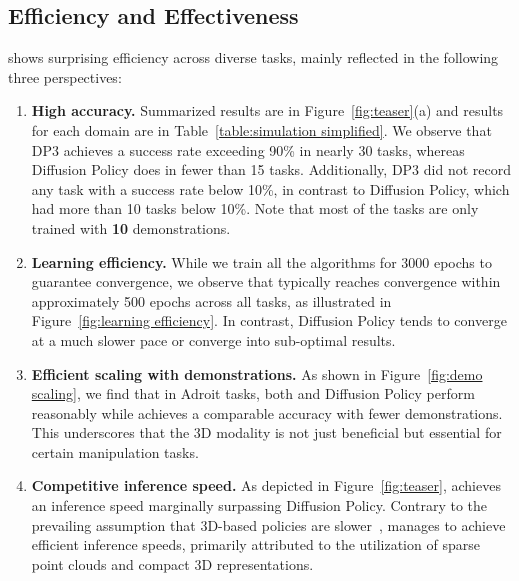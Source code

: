 \subsection{Efficiency and Effectiveness}
\ours shows surprising efficiency across diverse tasks, mainly reflected in the following three perspectives: 
\begin{enumerate}
    \item \textbf{High accuracy.} Summarized results are in Figure~\ref{fig:teaser}(a) and results for each domain are in Table~\ref{table:simulation simplified}. 
    We observe that DP3 achieves a success rate exceeding 90\% in nearly 30 tasks, whereas Diffusion Policy does in fewer than 15 tasks. Additionally, DP3 did not record any task with a success rate below 10\%, in contrast to Diffusion Policy, which had more than 10 tasks below 10\%. Note that most of the tasks are only trained with \textbf{10} demonstrations.
    \item \textbf{Learning efficiency.}
    While we train all the algorithms for 3000 epochs to guarantee convergence, we observe that \ours typically reaches convergence within approximately 500 epochs across all tasks, as illustrated in Figure~\ref{fig:learning efficiency}. In contrast, Diffusion Policy tends to converge at a much slower pace or converge into sub-optimal results.
    \item \textbf{Efficient scaling with demonstrations.} As shown in Figure~\ref{fig:demo scaling}, we find that in Adroit tasks, both \ours and Diffusion Policy perform reasonably while \ours achieves a comparable accuracy with fewer demonstrations.  This underscores that the 3D modality is not just beneficial but essential for certain manipulation tasks.
    \item \textbf{Competitive inference speed.} As depicted in Figure~\ref{fig:teaser}, \ours achieves an inference speed marginally surpassing Diffusion Policy. Contrary to the prevailing assumption that 3D-based policies are slower~\citep{shridhar2023peract,ze2023gnfactor,xian2023chaineddiffuser}, \ours manages to achieve efficient inference speeds, primarily attributed to the utilization of sparse point clouds and compact 3D representations.
\end{enumerate}








